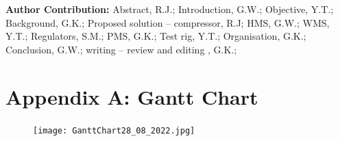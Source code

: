\documentclass[a4paper,11pt]{article}
\begin{document}
\textbf{Author Contribution: }Abstract, R.J.; Introduction, G.W.; Objective, Y.T.; Background, G.K.; Proposed solution – compressor, R.J; HMS, G.W.; WMS, Y.T.; Regulators, S.M.; PMS, G.K.; Test rig, Y.T.; Organisation, G.K.; Conclusion, G.W.; writing – review and editing , G.K.; 

\newpage







\newpage
\appendix
\appendixpage
\section{Appendix A: Gantt Chart}\label{section:gantt}

\begin{figure}[h]\label{fig:ganttChart} 
    \texttt{[image: GanttChart28\_08\_2022.jpg]}
    \centering
\end{figure}
\end{document}
